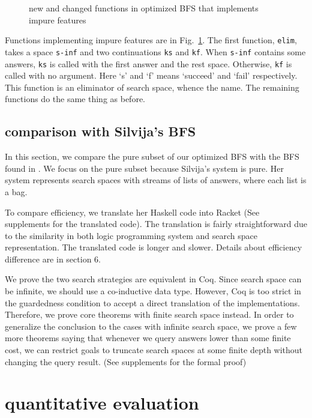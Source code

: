 \documentclass[format=acmlarge, review=true, authordraft=true]{acmart}
\begin{document}
\begin{figure}
		
	\caption{new and changed functions in optimized BFS that implements impure 
		features}
	\label{BFS-opt-cont}
\end{figure}

Functions implementing impure features are in Fig.~\ref{BFS-opt-cont}. The 
first function, \texttt{elim}, takes a space \texttt{s-inf} and two 
continuations \texttt{ks} and \texttt{kf}. When \texttt{s-inf} contains some 
answers, \texttt{ks} is called with the first answer and the rest space. 
Otherwise, \texttt{kf} is called with no argument. Here `s' and `f' means 
`succeed' and `fail' respectively. This function is an eliminator of search 
space, whence the name. The remaining functions do the same thing as before.

\subsection{comparison with Silvija's BFS}

In this section, we compare the pure subset of our optimized BFS with the BFS 
found in \citep{seres1999algebra}. We focus on the pure subset because 
Silvija's system is pure. Her system represents search spaces with streams of 
lists of answers, where each list is a bag.

To compare efficiency, we translate her Haskell code into Racket (See 
supplements for the translated code). The translation is fairly straightforward 
due to the similarity in both logic programming system and search space 
representation. The translated code is longer and slower. Details about 
efficiency difference are in section 6.

We prove the two search strategies are equivalent in Coq. Since search space 
can be infinite, we should use a co-inductive data type. However, Coq is too 
strict in the guardedness condition to accept a direct translation of the 
implementations. Therefore, we prove core theorems with finite search space 
instead. In order to generalize the conclusion to the cases with infinite 
search space, we prove a few more theorems saying that whenever we query 
answers lower than some finite cost, we can restrict goals to truncate search 
spaces at some finite depth without changing the query result. (See supplements 
for the formal proof)

\section{quantitative evaluation}
\end{document}

